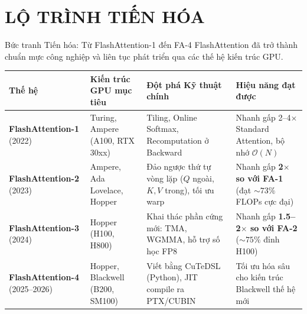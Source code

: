 \documentclass[aspectratio=169,11pt]{beamer}
\begin{document}
\section{LỘ TRÌNH TIẾN HÓA}
\begin{frame}{Bức tranh Tiến hóa: Từ FlashAttention-1 đến FA-4}
  \vspace{-0.3em}
  {\fontsize{9.5pt}{12pt}\selectfont \color{MutedText}FlashAttention đã trở thành chuẩn mực công nghiệp và liên tục phát triển qua các thế hệ kiến trúc GPU.}
  \vspace{0.3em}

  \begin{center}
  \fontsize{7pt}{9pt}\selectfont
  \setlength{\tabcolsep}{3.5pt}
  \renewcommand{\arraystretch}{1.06}
  \begin{tabular}{p{2.1cm}p{3.1cm}p{3.1cm}p{3.8cm}}
    \toprule
    \textbf{Thế hệ} & \textbf{Kiến trúc GPU mục tiêu} & \textbf{Đột phá Kỹ thuật chính} & \textbf{Hiệu năng đạt được} \\
    \midrule
    \textbf{FlashAttention-1} \newline (2022) & Turing, Ampere (A100, RTX 30xx) & Tiling, Online Softmax, Recomputation ở Backward & Nhanh gấp 2--4$\times$ Standard Attention, bộ nhớ $\mathcal{O}(N)$ \\
    \midrule
    \textbf{FlashAttention-2} \newline (2023) & Ampere, Ada Lovelace, Hopper & Đảo ngược thứ tự vòng lặp ($Q$ ngoài, $K,V$ trong), tối ưu warp & Nhanh gấp \textbf{2$\times$ so với FA-1} (đạt $\sim 73\%$ FLOPs cực đại) \\
    \midrule
    \textbf{FlashAttention-3} \newline (2024) & Hopper (H100, H800) & Khai thác phần cứng mới: TMA, WGMMA, hỗ trợ số học FP8 & Nhanh gấp \textbf{1.5--2$\times$ so với FA-2} ($\sim 75\%$ đỉnh H100) \\
    \midrule
    \textbf{FlashAttention-4} \newline (2025--2026) & Hopper, Blackwell (B200, SM100) & Viết bằng CuTeDSL (Python), JIT compile ra PTX/CUBIN & Tối ưu hóa sâu cho kiến trúc Blackwell thế hệ mới \\
    \bottomrule
  \end{tabular}
  \end{center}
\end{frame}

\end{document}
